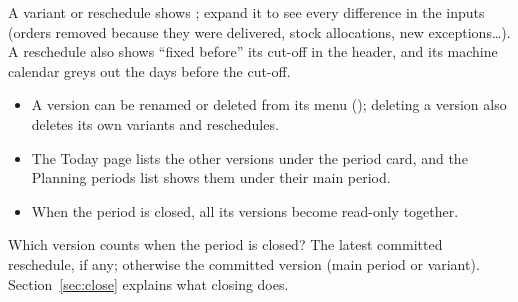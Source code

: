 
A variant or reschedule shows ; expand it to see every
difference in the inputs (orders removed because they were delivered, stock allocations, new exceptions\dots).
A reschedule also shows ``fixed before'' its cut-off in the header, and its machine calendar greys out the
days before the cut-off.

\begin{itemize}
  \item A version can be renamed or deleted from its  menu (); deleting a
        version also deletes its own variants and reschedules.
  \item The Today page lists the other versions under the period card, and the Planning periods list shows
        them under their main period.
  \item When the period is closed, all its versions become read-only together.
\end{itemize}

\begin{note}
Which version counts when the period is closed? The latest committed reschedule, if any; otherwise the
committed version (main period or variant). Section~\ref{sec:close} explains what closing does.
\end{note}
